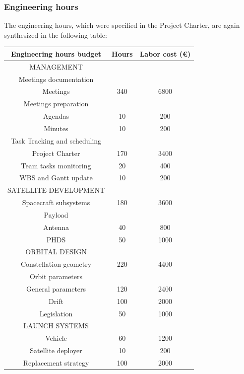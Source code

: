 \subsubsection{Engineering hours}
The engineering hours, which were specified in the Project Charter, are again synthesized in the following table:

\begin{longtable}{ccc}
\toprule
\rowcolor[gray]{0.65}
    \textbf{Engineering hours budget} & \textbf{Hours} & \textbf{Labor cost (\euro)} \\
    \midrule
    \endhead
\hline
\rowcolor[gray]{0.85}
	MANAGEMENT &  &  \\ \hline
	Meetings documentation &  &  \\ \hline
	Meetings & 340 & 6800 \\ \hline
	Meetings preparation &  &  \\ \hline
	Agendas & 10 & 200 \\ \hline
	Minutes & 10 & 200 \\ \hline
	Task Tracking and scheduling &  &  \\ \hline
	Project Charter & 170 & 3400 \\ \hline
	Team tasks monitoring & 20 & 400 \\ \hline
	WBS and Gantt update & 10 & 200 \\ \hline
	\rowcolor[gray]{0.85}
	SATELLITE DEVELOPMENT &  &  \\ \hline
	Spacecraft subsystems & 180 & 3600 \\ \hline
	Payload &  &  \\ \hline
	Antenna & 40 & 800 \\ \hline
	PHDS & 50 & 1000 \\ \hline
	\rowcolor[gray]{0.85}
	ORBITAL DESIGN &  &  \\ \hline
	Constellation geometry & 220 & 4400 \\ \hline
	Orbit parameters &  &  \\ \hline
	General parameters & 120 & 2400 \\ \hline
	Drift & 100 & 2000 \\ \hline
	Legislation & 50 & 1000 \\ \hline
	\rowcolor[gray]{0.85}
	LAUNCH SYSTEMS &  &  \\ \hline
	Vehicle & 60 & 1200 \\ \hline
	Satellite deployer & 10 & 200 \\ \hline
	Replacement strategy & 100 & 2000 \\ \hline

\end{longtable}
